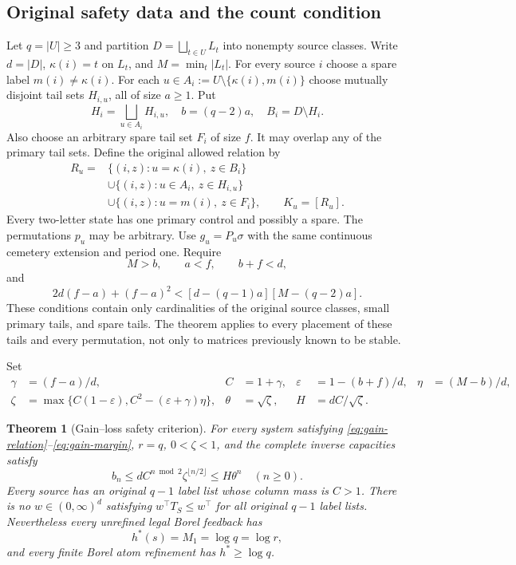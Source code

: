 \documentclass[11pt,reqno]{amsart}
\numberwithin{equation}{section}
\newtheorem{theorem}{Theorem}[section]
\theoremstyle{definition}
\newcommand{\eps}{\varepsilon}
\begin{document}
\subsection{Original safety data and the count condition}
Let $q=|U|\ge3$ and partition $D=\bigsqcup_{t\in U}L_t$ into
nonempty source classes. Write $d=|D|$,
$\kappa(i)=t$ on $L_t$, and $M=\min_t|L_t|$.
For every source $i$ choose a spare label $m(i)\ne\kappa(i)$.
For each $u\in A_i:=U\setminus\{\kappa(i),m(i)\}$ choose
mutually disjoint tail sets $H_{i,u}$, all of size $a\ge1$.
Put
\[
 H_i=\bigsqcup_{u\in A_i}H_{i,u},\quad b=(q-2)a,\quad
 B_i=D\setminus H_i.
\]
Also choose an arbitrary spare tail set $F_i$ of size $f$.
It may overlap any of the primary tail sets. Define the original
allowed relation by
\begin{align}
 R_u={}&\{(i,z):u=\kappa(i),\ z\in B_i\}\nonumber\\
 &\cup\{(i,z):u\in A_i,\ z\in H_{i,u}\}\label{eq:gain-relation}\\
 &\cup\{(i,z):u=m(i),\ z\in F_i\},\qquad K_u=[R_u].\nonumber
\end{align}
Every two-letter state has one primary control and possibly a spare.
The permutations $p_u$ may be arbitrary. Use $g_u=P_u\sigma$
with the same continuous cemetery extension and period one.
Require
\begin{equation}\label{eq:gain-counts}
 M>b,\qquad a<f,\qquad b+f<d,
\end{equation}
and
\begin{equation}\label{eq:gain-margin}
 2d(f-a)+(f-a)^2<[d-(q-1)a][M-(q-2)a].
\end{equation}
These conditions contain only cardinalities of the original source
classes, small primary tails, and spare tails. The theorem applies
to every placement of these tails and every permutation, not only
to matrices previously known to be stable.

Set
\begin{align}
 \gamma&=(f-a)/d,& C&=1+\gamma,&
 \eps&=1-(b+f)/d,& \eta&=(M-b)/d,\nonumber\\
 \zeta&=\max\{C(1-\eps),C^2-(\eps+\gamma)\eta\},&
 \theta&=\sqrt\zeta,&H&=dC/\sqrt\zeta.
 \label{eq:gain-constants}
\end{align}

\begin{theorem}[Gain--loss safety criterion]\label{thm:gainloss}
For every system satisfying \eqref{eq:gain-relation}--\eqref{eq:gain-margin},
$r=q$, $0<\zeta<1$, and the complete inverse capacities satisfy
\begin{equation}\label{eq:gain-bn}
 b_n\le dC^{n\bmod2}\zeta^{\lfloor n/2\rfloor}
 \le H\theta^n\quad(n\ge0).
\end{equation}
Every source has an original $q-1$ label list whose column mass is
$C>1$. There is no $w\in(0,\infty)^d$ satisfying
$w^\top T_S\le w^\top$ for all original $q-1$ label lists.
Nevertheless every unrefined legal Borel feedback has
\begin{equation}\label{eq:gain-M}
 h^*(s)=M_1=\log q=\log r,
\end{equation}
and every finite Borel atom refinement has $h^*\ge\log q$.
\end{theorem}
\end{document}
